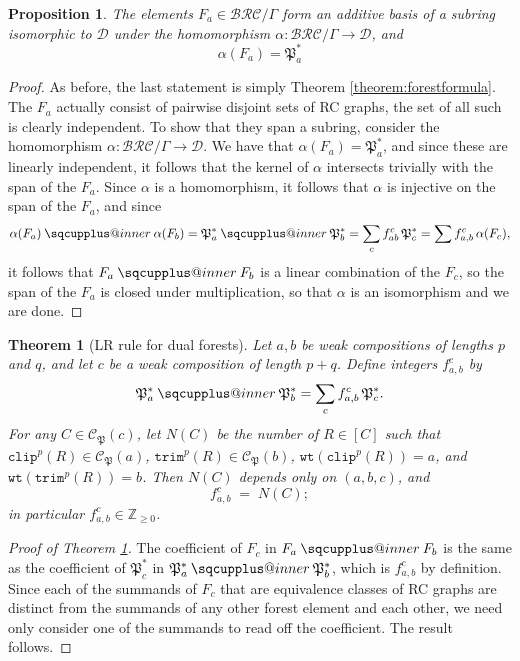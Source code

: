 \documentclass[a4paper,fleqn]{cas-sc}
\makeatletter
\newcommand{\sqcupplus@inner}[2]{%
  \vcenter{\hbox{\ooalign{%
    \hfil$\m@th#1\sqcup$\hfil\cr
    \hfil\raisebox{0.15ex}{$\m@th#1\scriptscriptstyle+$}\hfil\cr
  }}}%
}
\newcommand{\sqcupplus}{\mathbin{\mathpalette\sqcupplus@inner\relax}}
\newtheorem{proposition}[lemma]{Proposition}
\newtheorem{theorem}{Theorem}[section]
\theoremstyle{definition}
\theoremstyle{remark}
\numberwithin{equation}{subsection}
\newcommand{\wtt}{\mathtt{wt}}
\newcommand{\trm}{\mathtt{trim}}
\newcommand{\clp}{\mathtt{clip}}
\newcommand{\BRC}{\mathcal{BRC}}
\newcommand{\dcoma}{\mathcal{D}}
\newcommand{\forest}{\mathfrak{P}}
\makeatother
\begin{document}
\begin{proposition}
The elements $F_a\in\BRC/\Gamma$ form an additive basis of a subring isomorphic to $\dcoma$ under the homomorphism $\alpha:\BRC/\Gamma\to \dcoma$, and 
$$\alpha(F_a) = \forest_a^*$$
\end{proposition}
\begin{proof}
As before, the last statement is simply Theorem \ref{theorem:forestformula}. The $F_a$ actually consist of pairwise disjoint sets of RC graphs, the set of all such is clearly independent. To show that they span a subring, consider the homomorphism $\alpha:\BRC/\Gamma\to \dcoma$. We have that $\alpha(F_a)=\forest_a^*$, and since these are linearly independent, it follows that the kernel of $\alpha$ intersects trivially with the span of the $F_a$. Since $\alpha$ is a homomorphism, it follows that $\alpha$ is injective on the span of the $F_a$, and since 
$$\alpha(F_a)\sqcupplus\alpha(F_b) = \forest_a^*\sqcupplus\forest_b^*=\sum_{c}f_{ab}^c\,\forest_c^*=\sum f_{a,b}^c\,\alpha(F_c),$$ 
it follows that $F_a\sqcupplus F_b$ is a linear combination of the $F_c$, so the span of the $F_a$ is closed under multiplication, so that $\alpha$ is an isomorphism and we are done.
\end{proof}

\begin{theorem}[LR rule for dual forests]\label{theorem:LRforest}
Let $a,b$ be weak compositions of lengths $p$ and $q$, and let $c$ be a weak composition of length $p+q$. Define integers $f_{a,b}^c$ by
$$\forest_a^* \sqcupplus \forest_b^* = \sum_{c} f_{a,b}^c\,\forest_c^*.$$
For any $C\in\mathcal{C}_\forest(c)$, let $N(C)$ be the number of $R\in[C]$ such that $\clp^p(R)\in \mathcal{C}_\forest(a)$, $\trm^p(R)\in \mathcal{C}_\forest(b)$, $\wtt(\clp^p(R))=a$, and $\wtt(\trm^p(R))=b$. Then $N(C)$ depends only on $(a,b,c)$, and
$$f_{a,b}^c \;=\; N(C);$$
in particular $f_{a,b}^c\in\mathbb{Z}_{\geq 0}$.
\end{theorem}

\begin{proof}[Proof of Theorem \ref{theorem:LRforest}]
  The coefficient of $F_c$ in $F_a\sqcupplus F_b$ is the same as the coefficient of $\forest_c^*$ in $\forest_a^*\sqcupplus\forest_b^*$, which is $f_{a,b}^c$ by definition. Since each of the summands of $F_c$ that are equivalence classes of RC graphs are distinct from the summands of any other forest element and each other, we need only consider one of the summands to read off the coefficient. The result follows.
\end{proof}
\end{document}
